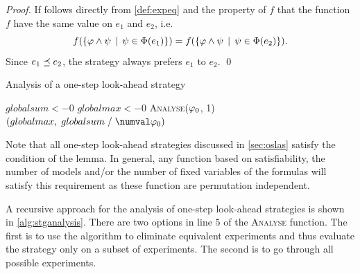 \begin{proof}
If follows directly from \autoref{def:expeq} and the property of $f$ that
the function $f$ have the same value on $e_1$ and $e_2$, i.e.
\[f(\{\varphi\wedge\psi\:\:|\:\: \psi\in\Phi(e_1)\}) =
 f(\{\varphi\wedge\psi\:\:|\:\: \psi\in\Phi(e_2)\}).\]
Since $e_1 \preceq e_2$, the strategy always prefers $e_1$ to $e_2$. \qed
\end{proof}

\vspace{-5mm}
\begin{algorithm}[ht]
\caption{Analysis of a one-step look-ahead strategy}
\label{alg:stganalysis}
\DontPrintSemicolon
{}
$globalsum <- 0$\;
$globalmax <- 0$\;
\textsc{Analyse}($\varphi_0$, 1)\;
\Return$ (globalmax,\; globalsum \;/\; \numval\init)$\;\medskip
\setcounter{AlgoLine}{0}
\end{algorithm}

Note that all one-step look-ahead strategies discussed in \autoref{sec:oslas}
  satisfy the condition of the lemma.
In general, any function based on satisfiability, the number of models and/or
  the number of fixed variables of the formulas will satisfy this requirement as
  these function are permutation independent.

A recursive approach for the analysis of one-step look-ahead strategies
  is shown in \autoref{alg:stganalysis}.
There are two options in line $5$ of the \textsc{Analyse} function.
The first is to use the algorithm to eliminate equivalent experiments and thus
  evaluate the strategy only on a subset of experiments.
The second is to go through all possible experiments.

